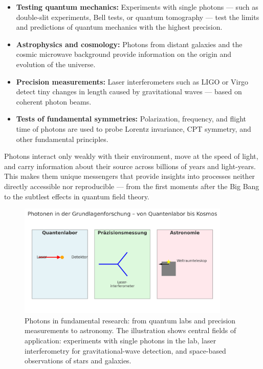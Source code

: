 \begin{itemize}
	\item \textbf{Testing quantum mechanics:} Experiments with single photons — such as double-slit experiments, Bell tests, or quantum tomography — test the limits and predictions of quantum mechanics with the highest precision.
	\item \textbf{Astrophysics and cosmology:} Photons from distant galaxies and the cosmic microwave background provide information on the origin and evolution of the universe.
	\item \textbf{Precision measurements:} Laser interferometers such as LIGO or Virgo detect tiny changes in length caused by gravitational waves — based on coherent photon beams.
	\item \textbf{Tests of fundamental symmetries:} Polarization, frequency, and flight time of photons are used to probe Lorentz invariance, CPT symmetry, and other fundamental principles.
\end{itemize}
\vspace{1em}
\begin{tcolorbox}[physikbox, title={Photons as Messengers of Natural Laws}, label={box:photonen_grundlagen}]
	\small
	Photons interact only weakly with their environment, move at the speed of light, and carry information about their source across billions of years and light-years.  
	This makes them unique messengers that provide insights into processes neither directly accessible nor reproducible — from the first moments after the Big Bang to the subtlest effects in quantum field theory.
\end{tcolorbox}
\newpage
\noindent
\begin{figure}[H]
	\centering
	\includegraphics[width=0.9\textwidth]{bilder/photonen_grundlagenforschung.png}
	\caption{Photons in fundamental research: 
		from quantum labs and precision measurements to astronomy. 
		The illustration shows central fields of application: 
		experiments with single photons in the lab, laser interferometry for gravitational-wave detection, and space-based observations of stars and galaxies.}
	\label{fig:photonen_grundlagen}
\end{figure}

